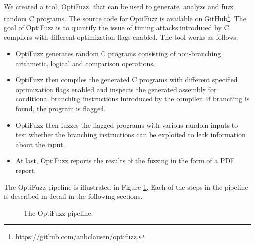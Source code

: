 We created a tool, OptiFuzz, that can be used to generate, analyze and fuzz random C programs.
The source code for OptiFuzz is available on GitHub\footnote{\url{https://github.com/anbclausen/optifuzz}.}.
The goal of OptiFuzz is to quantify the issue of timing attacks introduced by C compilers with different optimization flags enabled.
The tool works as follows:
\begin{itemize}
  \item OptiFuzz generates random C programs consisting of non-branching arithmetic, logical and comparison operations.
  \item OptiFuzz then compiles the generated C programs with different specified optimization flags enabled and inspects the generated assembly for conditional branching instructions introduced by the compiler.
        If branching is found, the program is flagged.
  \item OptiFuzz then fuzzes the flagged programs with various random inputs to test whether the branching instructions can be exploited to leak information about the input.
  \item At last, OptiFuzz reports the results of the fuzzing in the form of a PDF report.
\end{itemize}
The OptiFuzz pipeline is illustrated in Figure \ref{fig:optifuzz-pipeline}. 
Each of the steps in the pipeline is described in detail in the following sections.
\begin{figure}[H]
  \centering
  
  \caption{The OptiFuzz pipeline.}
  \label{fig:optifuzz-pipeline}
\end{figure}
